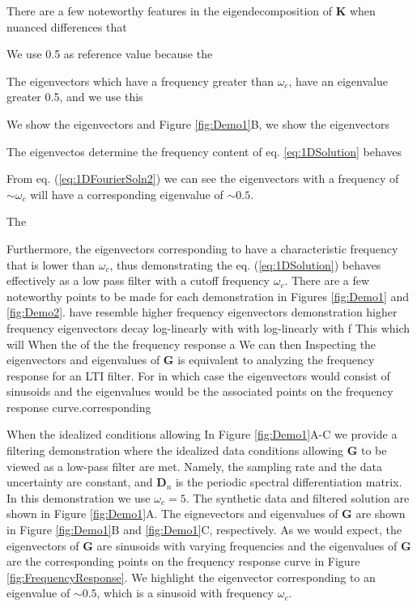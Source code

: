 \documentclass[10pt,a4paper]{article}
\begin{document}
  There are a few noteworthy features in the eigendecomposition of $\mathbf{K}$ when nuanced differences that  



  We use 0.5 as reference value because the 


  

The eigenvectors which have a frequency greater than $\omega_c$, have an eigenvalue greater 0.5, and we use this    

We show the eigenvectors and  Figure \ref{fig:Demo1}B, we show the eigenvectors    

The eigenvectos determine the frequency content of eq. \ref{eq:1DSolution} behaves 

From eq. (\ref{eq:1DFourierSoln2}) we can see the eigenvectors with a frequency of ${\sim}\omega_c$ will have a corresponding eigenvalue of ${\sim}0.5$.  



The 

 Furthermore, the eigenvectors corresponding to have a characteristic frequency that is lower than $\omega_c$, thus demonstrating the eq. (\ref{eq:1DSolution}) behaves effectively as a low pass filter with a cutoff frequency $\omega_c$.  There are a few noteworthy points to be made for each demonstration in Figures \ref{fig:Demo1} and \ref{fig:Demo2}.  have resemble higher frequency eigenvectors demonstration higher frequency eigenvectors decay log-linearly with  with log-linearly with f This   which  will  When the  of the the frequency response a  We can then Inspecting the eigenvectors and eigenvalues of  $\mathbf{G}$ is equivalent to analyzing the frequency response for an LTI filter.  For in which case the eigenvectors would consist of sinusoids and the eigenvalues would be the associated points on the frequency response curve.corresponding 

When the idealized conditions allowing  In Figure \ref{fig:Demo1}A-C we provide a filtering demonstration where the idealized data conditions allowing $\mathbf{G}$ to be viewed as a low-pass filter are met. Namely, the sampling rate and the data uncertainty are constant, and $\mathbf{D}_n$ is the periodic spectral differentiation matrix.  In this demonstration we use $\omega_c = 5$. The synthetic data and filtered solution are shown in Figure \ref{fig:Demo1}A.  The eignevectors and eigenvalues of $\mathbf{G}$ are shown in Figure \ref{fig:Demo1}B and \ref{fig:Demo1}C, respectively.  As we would expect, the eigenvectors of $\mathbf{G}$ are sinusoids with varying frequencies and the eigenvalues of $\mathbf{G}$ are the corresponding points on the frequency response curve in Figure \ref{fig:FrequencyResponse}.  We highlight the eigenvector corresponding to an eigenvalue of ${\sim}0.5$, which is a sinusoid with frequency $\omega_c$.
\end{document}
